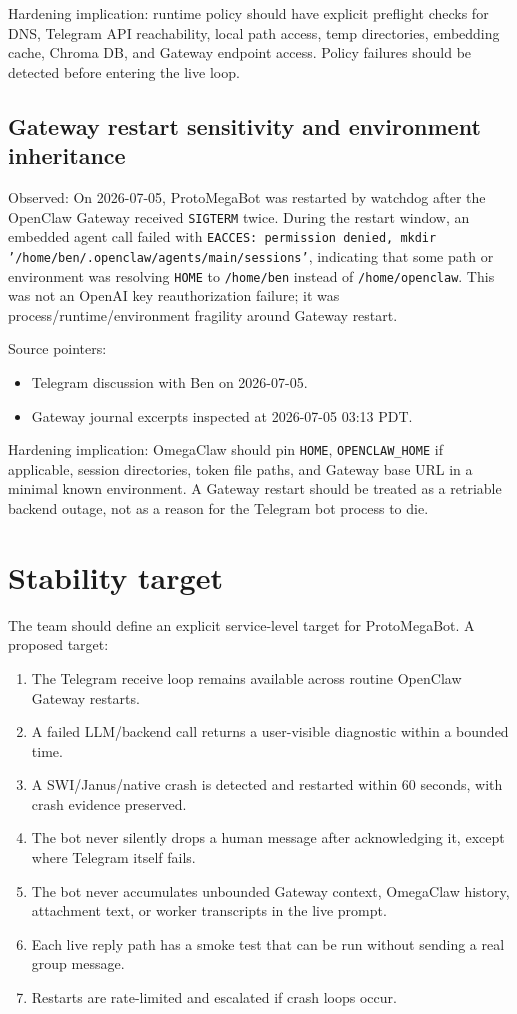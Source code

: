 \documentclass[11pt]{article}
\begin{document}
Hardening implication: runtime policy should have explicit preflight checks for DNS, Telegram API reachability, local path access, temp directories, embedding cache, Chroma DB, and Gateway endpoint access. Policy failures should be detected before entering the live loop.

\subsection{Gateway restart sensitivity and environment inheritance}

Observed: On 2026-07-05, ProtoMegaBot was restarted by watchdog after the OpenClaw Gateway received \texttt{SIGTERM} twice. During the restart window, an embedded agent call failed with \texttt{EACCES: permission denied, mkdir '/home/ben/.openclaw/agents/main/sessions'}, indicating that some path or environment was resolving \texttt{HOME} to \texttt{/home/ben} instead of \texttt{/home/openclaw}. This was not an OpenAI key reauthorization failure; it was process/runtime/environment fragility around Gateway restart.

Source pointers:
\begin{itemize}
  \item Telegram discussion with Ben on 2026-07-05.
  \item Gateway journal excerpts inspected at 2026-07-05 03:13 PDT.
\end{itemize}

Hardening implication: OmegaClaw should pin \texttt{HOME}, \texttt{OPENCLAW\_HOME} if applicable, session directories, token file paths, and Gateway base URL in a minimal known environment. A Gateway restart should be treated as a retriable backend outage, not as a reason for the Telegram bot process to die.

\section{Stability target}

The team should define an explicit service-level target for ProtoMegaBot. A proposed target:

\begin{enumerate}
  \item The Telegram receive loop remains available across routine OpenClaw Gateway restarts.
  \item A failed LLM/backend call returns a user-visible diagnostic within a bounded time.
  \item A SWI/Janus/native crash is detected and restarted within 60 seconds, with crash evidence preserved.
  \item The bot never silently drops a human message after acknowledging it, except where Telegram itself fails.
  \item The bot never accumulates unbounded Gateway context, OmegaClaw history, attachment text, or worker transcripts in the live prompt.
  \item Each live reply path has a smoke test that can be run without sending a real group message.
  \item Restarts are rate-limited and escalated if crash loops occur.
\end{enumerate}
\end{document}
